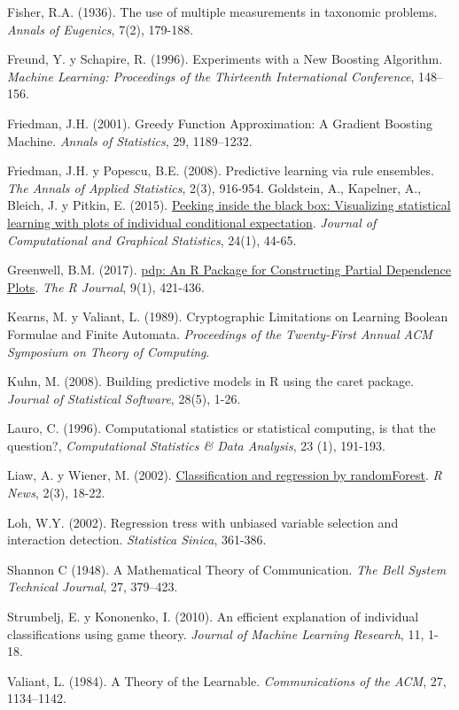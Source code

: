 \documentclass[]{book}
\theoremstyle{break}
\theoremstyle{definition}
\theoremstyle{definition}
\theoremstyle{definition}
\theoremstyle{remark}
\begin{document}
Fisher, R.A. (1936). The use of multiple measurements in taxonomic
problems. \emph{Annals of Eugenics}, 7(2), 179-188.

Freund, Y. y Schapire, R. (1996). Experiments with a New Boosting
Algorithm. \emph{Machine Learning: Proceedings of the Thirteenth
International Conference}, 148--156.

Friedman, J.H. (2001). Greedy Function Approximation: A Gradient
Boosting Machine. \emph{Annals of Statistics}, 29, 1189--1232.

Friedman, J.H. y Popescu, B.E. (2008). Predictive learning via rule
ensembles. \emph{The Annals of Applied Statistics}, 2(3), 916-954.
Goldstein, A., Kapelner, A., Bleich, J. y Pitkin, E. (2015).
\href{https://doi.org/10.1080/10618600.2014.907095}{Peeking inside the
black box: Visualizing statistical learning with plots of individual
conditional expectation}. \emph{Journal of Computational and Graphical
Statistics}, 24(1), 44-65.

Greenwell, B.M. (2017).
\href{https://journal.r-project.org/archive/2017/RJ-2017-016/index.html}{pdp:
An R Package for Constructing Partial Dependence Plots}. \emph{The R
Journal}, 9(1), 421-436.

Kearns, M. y Valiant, L. (1989). Cryptographic Limitations on Learning
Boolean Formulae and Finite Automata. \emph{Proceedings of the
Twenty-First Annual ACM Symposium on Theory of Computing}.

Kuhn, M. (2008). Building predictive models in R using the caret
package. \emph{Journal of Statistical Software}, 28(5), 1-26.

Lauro, C. (1996). Computational statistics or statistical computing, is
that the question?, \emph{Computational Statistics \& Data Analysis}, 23
(1), 191-193.

Liaw, A. y Wiener, M. (2002).
\href{https://www.r-project.org/doc/Rnews/Rnews_2002-3.pdf}{Classification
and regression by randomForest}. \emph{R News}, 2(3), 18-22.

Loh, W.Y. (2002). Regression tress with unbiased variable selection and
interaction detection. \emph{Statistica Sinica}, 361-386.

Shannon C (1948). A Mathematical Theory of Communication. \emph{The Bell
System Technical Journal}, 27, 379--423.

Strumbelj, E. y Kononenko, I. (2010). An efficient explanation of
individual classifications using game theory. \emph{Journal of Machine
Learning Research}, 11, 1-18.

Valiant, L. (1984). A Theory of the Learnable. \emph{Communications of
the ACM}, 27, 1134--1142.


\end{document}

